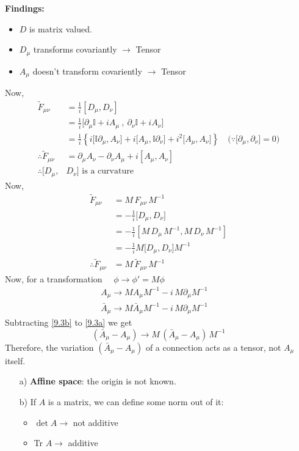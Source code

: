 \documentclass[14pt]{article} %
\begin{document}
\textbf{Findings:}
\begin{itemize}
\item $D$ is matrix valued.
\item $D_\mu$ transforms covariantly $\to$ Tensor
\item $A_\mu$ doesn't transform covariently $\to$ Tensor
\end{itemize}
Now,
\begin{align*}
\tilde{F}_{\mu \nu} &= \frac{1}{i} [D_\mu, D_\nu] \\
&= \frac{1}{i}\big[\partial_\mu \mathbb{I}+ i A_\mu ~,~ \partial_\nu \mathbb{I}+ i A_\nu  \big] \\
&= \frac{1}{i}\left\{ i \big[ \mathbb{I} \partial_\mu , A_\nu \big] + i\big[ A_{\mu}, \mathbb{I} \partial_\nu\big]+i^2 \big[A_\mu , A_\nu \big] \right\} \quad \big( \because \big[ \partial_\mu , \partial_\nu \big] =0 \big)  \\
\therefore\tilde{F}_{\mu\nu} &= \partial_\mu A_\nu - \partial_\nu A_\mu + i[A_\mu, A_\nu] \\
\therefore [D_\mu, &D_\nu] \text{ is a curvature}
\end{align*}
Now,
\begin{align*}
\tilde{F}_{\mu \nu} &= M \,F_{\mu \nu} \, M^{-1} \\
&= -\frac{1}{i} \big[D_\mu, D_\nu \big] \\
&= -\frac{1}{i} \left[ M \,D_\mu \,M^{-1}, M \, D_\nu \, M^{-1} \right] \\
&= -\frac{1}{i} M \big[D_\mu, D_\nu \big] M^{-1} \\
\therefore \tilde{F}_{\mu \nu}&= M \,\tilde{F}_{\mu \nu}\, M^{-1}
\end{align*}
Now, for a transformation $\quad \phi \to \phi' = M \phi$
\begin{align*}
A_\mu \to M A_\mu M^{-1} - i \,M \partial_\mu M^{-1} \quad \tag{9.3a} \label{9.3a} \\
\bar{A}_\mu \to M \bar{A}_\mu M^{-1} - i\,M \partial_\mu M^{-1} \quad \tag{9.3b} \label{9.3b}
\end{align*}
Subtracting \eqref{9.3b} to \eqref{9.3a} we get
\[
(\bar{A}_\mu - A_\mu) \to M\,(\bar{A}_\mu - A_\mu) \, M^{-1}
\]
Therefore, the variation $(\bar{A}_\mu - A_\mu)$ of a connection acts as a tensor, not $A_\mu$ itself.
\begin{tcolorbox}[ title=Extra information]
\begin{itemize}
\item [a)] \textbf{Affine space}: the origin is not known.
\item [b)] If $A$ is a matrix, we can define some norm out of it:
    \begin{itemize}
        \item $\det A \to$ not additive
        \item Tr $A \to$ additive
    \end{itemize}
\end{itemize}
\end{tcolorbox}
\end{document}
